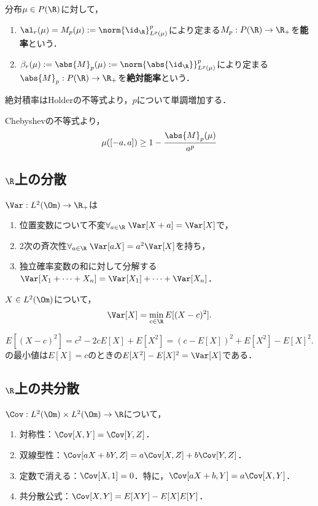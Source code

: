 \documentclass[uplatex,dvipdfmx]{jsreport}
\begin{document}
\begin{definition}
    分布$\mu\in P(\R)$に対して，
    \begin{enumerate}
        \item $\al_r(\mu)=M_p(\mu):=\norm{\id_\R}_{L^p(\mu)}^p$により定まる$M_p:P(\R)\to\R_+$を\textbf{能率}という．
        \item $\beta_r(\mu):=\abs{M}_p(\mu):=\norm{\abs{\id_\R}}_{L^p(\mu)}^p$により定まる$\abs{M}_p:P(\R)\to\R_+$を\textbf{絶対能率}という．
    \end{enumerate}
    絶対積率はHolderの不等式より，$p$について単調増加する．
\end{definition}

\begin{corollary}
    Chebyshevの不等式より，
    \[\mu([-a,a])\ge 1-\frac{\abs{M}_p(\mu)}{a^p}\]
\end{corollary}

\subsection{$\R$上の分散}

\begin{theorem}
    $\Var:L^2(\Om)\to\R_+$は
    \begin{enumerate}
        \item 位置変数について不変$\forall_{a\in\R}\;\Var[X+a]=\Var[X]$で，
        \item 2次の斉次性$\forall_{a\in\R}\;\Var[aX]=a^2\Var[X]$を持ち，
        \item 独立確率変数の和に対して分解する$\Var[X_1+\cdots+X_n]=\Var[X_1]+\cdots+\Var[X_n]$．
    \end{enumerate}
\end{theorem}

\begin{proposition}[分散の特徴付け]
    $X\in L^2(\Om)$について，
    \[\Var[X]=\min_{c\in\R}E[(X-c)^2].\]
\end{proposition}
\begin{Proof}
    \[E[(X-c)^2]=c^2-2cE[X]+E[X^2]=(c-E[X])^2+E[X^2]-E[X]^2.\]
    の最小値は$E[X]=c$のときの$E[X^2]-E[X]^2=\Var[X]$である．
\end{Proof}

\subsection{$\R$上の共分散}

\begin{theorem}
    $\Cov:L^2(\Om)\times L^2(\Om)\to\R$について，
    \begin{enumerate}
        \item 対称性：$\Cov[X,Y]=\Cov[Y,Z]$．
        \item 双線型性：$\Cov[aX+bY,Z]=a\Cov[X,Z]+b\Cov[Y,Z]$．
        \item 定数で消える：$\Cov[X,1]=0$．特に，$\Cov[aX+b,Y]=a\Cov[X,Y]$．
        \item 共分散公式：$\Cov[X,Y]=E[XY]-E[X]E[Y]$．
    \end{enumerate}
\end{theorem}
\end{document}
